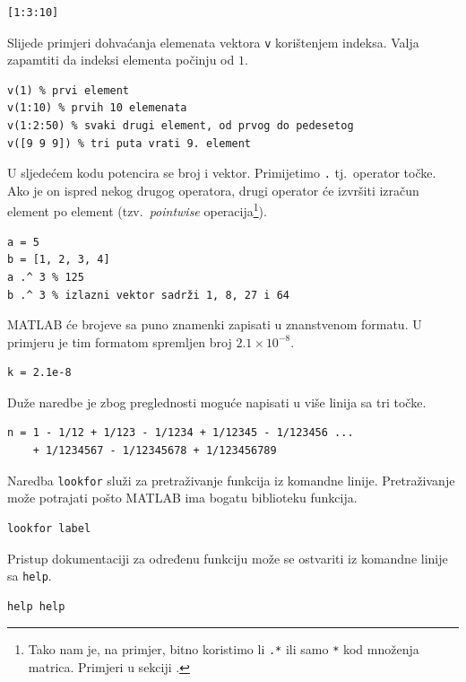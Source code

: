 \documentclass[a4paper, 10pt]{article}
\newcommand{\spec}[1]{\texttt{#1}} %
\newcommand{\eng}[1]{\emph{#1}} %
\begin{document}
\begin{lstlisting}
[1:3:10]
\end{lstlisting}

Slijede primjeri dohvaćanja elemenata vektora \spec{v} korištenjem indeksa.
Valja zapamtiti da indeksi elementa počinju od $1$.

\begin{lstlisting}
v(1) % prvi element
v(1:10) % prvih 10 elemenata
v(1:2:50) % svaki drugi element, od prvog do pedesetog
v([9 9 9]) % tri puta vrati 9. element
\end{lstlisting}

U sljedećem kodu potencira se broj i vektor.
Primijetimo \spec{.} tj.\ operator točke.
Ako je on ispred nekog drugog operatora, drugi operator će izvršiti izračun element po element (tzv.\ \eng{pointwise} operacija\footnote{Tako nam je, na primjer, bitno koristimo li \spec{.*} ili samo \spec{*} kod množenja matrica.
Primjeri u sekciji .}).

\begin{lstlisting}
a = 5
b = [1, 2, 3, 4]
a .^ 3 % 125
b .^ 3 % izlazni vektor sadrži 1, 8, 27 i 64
\end{lstlisting}

MATLAB će brojeve sa puno znamenki zapisati u znanstvenom formatu.
U primjeru je tim formatom spremljen broj $2.1 \times 10^{-8}$.

\begin{lstlisting}
k = 2.1e-8
\end{lstlisting}

Duže naredbe je zbog preglednosti moguće napisati u više linija sa tri točke.

\begin{lstlisting}
n = 1 - 1/12 + 1/123 - 1/1234 + 1/12345 - 1/123456 ...
    + 1/1234567 - 1/12345678 + 1/123456789
\end{lstlisting}

\pagebreak

Naredba \spec{lookfor} služi za pretraživanje funkcija iz komandne linije.
Pretraživanje može potrajati pošto MATLAB ima bogatu biblioteku funkcija.

\begin{lstlisting}
lookfor label
\end{lstlisting}

Pristup dokumentaciji za određenu funkciju može se ostvariti iz komandne linije sa \spec{help}.

\begin{lstlisting}
help help
\end{lstlisting}
\end{document}
